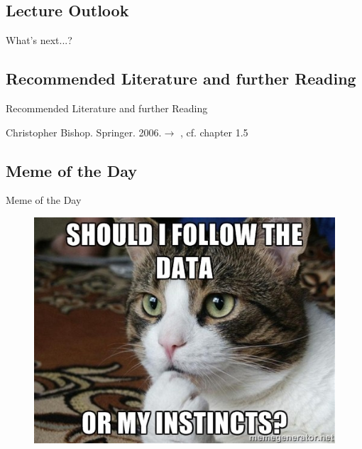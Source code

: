 \subsection{Lecture Outlook}

\begin{frame}{What's next...?}{}
\end{frame}


\subsection{Recommended Literature and further Reading}

\begin{frame}{Recommended Literature and further Reading}{}
	\footnotesize
	\begin{thebibliography}{2}
			{Christopher Bishop. Springer. 2006.}{$\rightarrow$ \href{
				http://users.isr.ist.utl.pt/~wurmd/Livros/school/Bishop\%20-\%20Pattern\%20Recognition\%20And\%20Machine\%20Learning\%20-\%20Springer\%20\%202006.pdf
			}{}, cf. chapter 1.5}
	\end{thebibliography}
\end{frame}


\subsection{Meme of the Day}

\begin{frame}{Meme of the Day}{}
	\begin{figure}
		\includegraphics[scale=0.35]{03_decision_theory/02_img/meme_of_the_day}
	\end{figure}
\end{frame}


\makethanks


